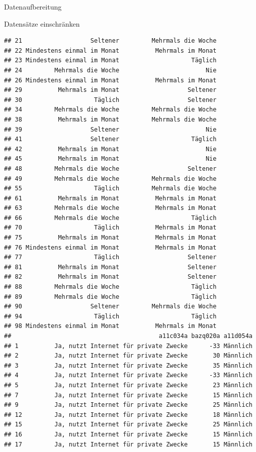 \documentclass[ignorenonframetext,]{beamer}
\begin{document}
\begin{frame}[fragile]{Datenaufbereitung}
\begin{block}{Datensätze einschränken}
\begin{verbatim}
## 21                   Seltener         Mehrmals die Woche
## 22 Mindestens einmal im Monat          Mehrmals im Monat
## 23 Mindestens einmal im Monat                    Täglich
## 24         Mehrmals die Woche                        Nie
## 26 Mindestens einmal im Monat          Mehrmals im Monat
## 29          Mehrmals im Monat                   Seltener
## 30                    Täglich                   Seltener
## 34         Mehrmals die Woche         Mehrmals die Woche
## 38          Mehrmals im Monat         Mehrmals die Woche
## 39                   Seltener                        Nie
## 41                   Seltener                    Täglich
## 42          Mehrmals im Monat                        Nie
## 45          Mehrmals im Monat                        Nie
## 48         Mehrmals die Woche                   Seltener
## 49         Mehrmals die Woche         Mehrmals die Woche
## 55                    Täglich         Mehrmals die Woche
## 61          Mehrmals im Monat          Mehrmals im Monat
## 63         Mehrmals die Woche          Mehrmals im Monat
## 66         Mehrmals die Woche                    Täglich
## 70                    Täglich          Mehrmals im Monat
## 75          Mehrmals im Monat          Mehrmals im Monat
## 76 Mindestens einmal im Monat          Mehrmals im Monat
## 77                    Täglich                   Seltener
## 81          Mehrmals im Monat                   Seltener
## 82          Mehrmals im Monat                   Seltener
## 88         Mehrmals die Woche                    Täglich
## 89         Mehrmals die Woche                    Täglich
## 90                   Seltener         Mehrmals die Woche
## 94                    Täglich                    Täglich
## 98 Mindestens einmal im Monat          Mehrmals im Monat
##                                         a11c034a bazq020a a11d054a
## 1          Ja, nutzt Internet für private Zwecke      -33 Männlich
## 2          Ja, nutzt Internet für private Zwecke       30 Männlich
## 3          Ja, nutzt Internet für private Zwecke       35 Männlich
## 4          Ja, nutzt Internet für private Zwecke      -33 Männlich
## 5          Ja, nutzt Internet für private Zwecke       23 Männlich
## 7          Ja, nutzt Internet für private Zwecke       15 Männlich
## 9          Ja, nutzt Internet für private Zwecke       25 Männlich
## 12         Ja, nutzt Internet für private Zwecke       18 Männlich
## 15         Ja, nutzt Internet für private Zwecke       25 Männlich
## 16         Ja, nutzt Internet für private Zwecke       15 Männlich
## 17         Ja, nutzt Internet für private Zwecke       15 Männlich

\end{verbatim}
\end{block}
\end{frame}
\end{document}
